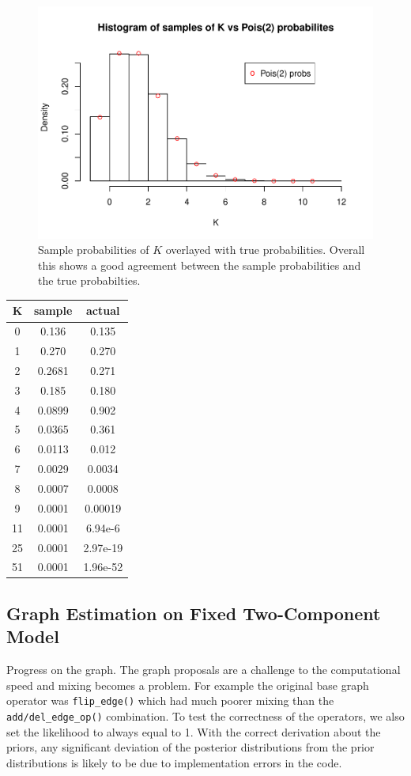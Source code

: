 \documentclass[11pt,a4paper]{article}
\numberwithin{equation}{section}
\begin{document}
\begin{figure}
\centering
\includegraphics{thesis_draft_files/figure-latex/unnamed-chunk-8-1.pdf}
\caption{\label{fig:pois_hist} Sample probabilities of \(K\) overlayed
with true probabilities. Overall this shows a good agreement between the
sample probabilities and the true probabilties.}
\end{figure}

\begin{longtable}[]{@{}ccc@{}}
\toprule
K & sample & actual\tabularnewline
\midrule
\endhead
0 & 0.136 & 0.135\tabularnewline
1 & 0.270 & 0.270\tabularnewline
2 & 0.2681 & 0.271\tabularnewline
3 & 0.185 & 0.180\tabularnewline
4 & 0.0899 & 0.902\tabularnewline
5 & 0.0365 & 0.361\tabularnewline
6 & 0.0113 & 0.012\tabularnewline
7 & 0.0029 & 0.0034\tabularnewline
8 & 0.0007 & 0.0008\tabularnewline
9 & 0.0001 & 0.00019\tabularnewline
11 & 0.0001 & 6.94e-6\tabularnewline
25 & 0.0001 & 2.97e-19\tabularnewline
51 & 0.0001 & 1.96e-52\tabularnewline
\bottomrule
\end{longtable}

\hypertarget{graph-estimation-on-fixed-two-component-model}{%
\subsection{Graph Estimation on Fixed Two-Component
Model}\label{graph-estimation-on-fixed-two-component-model}}

Progress on the graph. The graph proposals are a challenge to the
computational speed and mixing becomes a problem. For example the
original base graph operator was \texttt{flip\_edge()} which had much
poorer mixing than the \texttt{add/del\_edge\_op()} combination. To test
the correctness of the operators, we also set the likelihood to always
equal to 1. With the correct derivation about the priors, any
significant deviation of the posterior distributions from the prior
distributions is likely to be due to implementation errors in the code.
\end{document}
